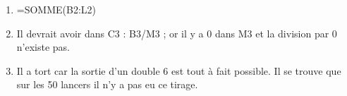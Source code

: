
\medskip

%

\begin{enumerate}
\item %
=SOMME(B2:L2)
\item %
Il devrait avoir dans C3 : B3/M3 ; or il y a 0 dans M3 et la division par 0 n'existe pas.
\item %
Il a tort car la sortie d'un double 6 est tout à fait possible. Il se trouve que sur les 50 lancers il n'y a pas eu ce tirage.
\end{enumerate}
 
\bigskip  

